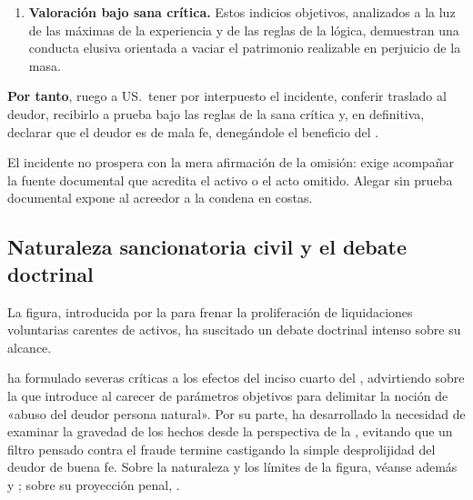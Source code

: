 \begin{escrito}
\begin{enumerate}[leftmargin=1.6em]
  \item \textbf{Valoración bajo sana crítica.} Estos indicios objetivos, analizados a la
  luz de las máximas de la experiencia y de las reglas de la lógica, demuestran una
  conducta elusiva orientada a vaciar el patrimonio realizable en perjuicio de la masa.
\end{enumerate}

\medskip
\noindent\textbf{Por tanto}, ruego a US.\ tener por interpuesto el incidente, conferir
traslado al deudor, recibirlo a prueba bajo las reglas de la sana crítica y, en
definitiva, declarar que el deudor es de mala fe, denegándole el beneficio del
\discharge{}.
\end{escrito}

\begin{alerta}
El incidente no prospera con la mera afirmación de la omisión: exige acompañar la fuente
documental que acredita el activo o el acto omitido. Alegar sin prueba documental expone
al acreedor a la condena en costas.
\end{alerta}

\bloqueJurisprudencial

\subsection{Naturaleza sancionatoria civil y el debate doctrinal}

La figura, introducida por la \Lreforma{} \citeyearpar{ley-21563} para frenar la proliferación
de liquidaciones voluntarias carentes de activos, ha suscitado un debate doctrinal intenso
sobre su alcance.

\textcite{alarcon-mala-fe} ha formulado severas críticas a los efectos del inciso cuarto del
, advirtiendo sobre la  que introduce al carecer de
parámetros objetivos para delimitar la noción de «abuso del deudor persona natural». Por su
parte, \textcite{goldenberg-sobreendeudamiento} ha desarrollado la necesidad de examinar la
gravedad de los hechos desde la perspectiva de la , evitando que un filtro pensado contra el fraude termine castigando la simple
desprolijidad del deudor de buena fe. Sobre la naturaleza y los límites de la figura, véanse
además \textcite{doc-mala-fe-uv} y \textcite{doc-limites-mala-fe}; sobre su proyección penal,
\textcite{doc-mala-fe-penal}.

